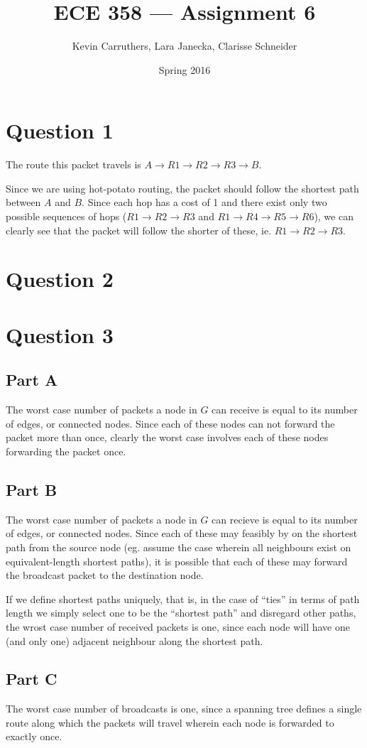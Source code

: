 \documentclass[12pt]{article}
\begin{document}
\title{ECE 358 --- Assignment 6}
\author{Kevin Carruthers, Lara Janecka, Clarisse Schneider}
\date{\vspace{-2ex}Spring 2016}
\maketitle\HRule

\section*{Question 1}
The route this packet travels is $A \to R1 \to R2 \to R3 \to B$.

Since we are using hot-potato routing, the packet should follow the shortest path between $A$ and $B$. Since each hop has a cost of 1 and there exist only two possible sequences of hops ($R1 \to R2 \to R3$ and $R1 \to R4 \to R5 \to R6$), we can clearly see that the packet will follow the shorter of these, ie. $R1 \to R2 \to R3$.

\section*{Question 2}

\section*{Question 3}
\subsection*{Part A}
The worst case number of packets a node in $G$ can receive is equal to its number of edges, or connected nodes. Since each of these nodes can not forward the packet more than once, clearly the worst case involves each of these nodes forwarding the packet once.

\subsection*{Part B}
The worst case number of packets a node in $G$ can recieve is equal to its number of edges, or connected nodes. Since each of these may feasibly by on the shortest path from the source node (eg. assume the case wherein all neighbours exist on equivalent-length shortest paths), it is possible that each of these may forward the broadcast packet to the destination node.

If we define shortest paths uniquely, that is, in the case of ``ties'' in terms of path length we simply select one to be the ``shortest path'' and disregard other paths, the wrost case number of received packets is one, since each node will have one (and only one) adjacent neighbour along the shortest path.

\subsection*{Part C}
The worst case number of broadcasts is one, since a spanning tree defines a single route along which the packets will travel wherein each node is forwarded to exactly once.
\end{document}
